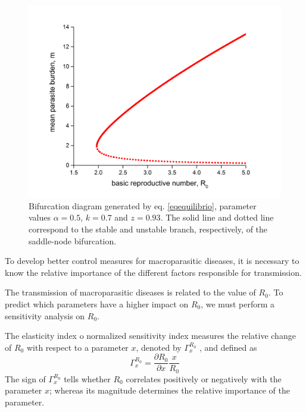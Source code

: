 \documentclass[eng]{MMSB-class-eng}
\begin{document}
\begin{figure}[h!]
	\centering
	\includegraphics[width=0.99\linewidth]{bifurcation}
	\caption{Bifurcation diagram generated by eq. \eqref{eqequilibrio}, parameter values $\alpha=0.5$, $k=0.7$ and $z=0.93$.
		The solid line and dotted line correspond to the stable and unstable branch, respectively, of the saddle-node bifurcation.}
	\label{f:phase}
\end{figure}

To develop better control measures for macroparasitic diseases, it is necessary to know the relative importance of the different factors responsible for transmission.

The transmission of macroparasitic diseases is related to the value of $R_0$. To predict which parameters have a higher impact on $R_0$, we must perform a sensitivity analysis on $R_0$.	

The elasticity index o normalized sensitivity index measures the relative change of $R_0$ with respect to a parameter $x$, denoted by $\Gamma^{R_0}_{x}$ , and defined as
\begin{equation}
\Gamma^{R_0}_{x}=\dfrac{\partial R_0}{\partial x} \dfrac{x}{R_0}
\end{equation}
The sign of $\Gamma^{R_0}_{x}$ tells whether $R_0$ correlates positively or negatively  with the  parameter $x$; whereas its magnitude determines the relative importance of the parameter.
\end{document}
